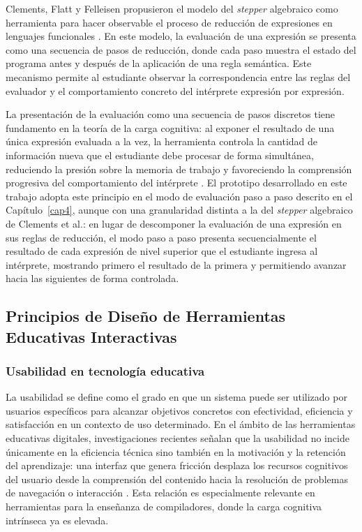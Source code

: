 Clements, Flatt y Felleisen propusieron el modelo del \textit{stepper} algebraico como herramienta para hacer observable el proceso de reducción de expresiones en lenguajes funcionales \cite{Clements2001}. En este modelo, la evaluación de una expresión se presenta como una secuencia de pasos de reducción, donde cada paso muestra el estado del programa antes y después de la aplicación de una regla semántica. Este mecanismo permite al estudiante observar la correspondencia entre las reglas del evaluador y el comportamiento concreto del intérprete expresión por expresión.

La presentación de la evaluación como una secuencia de pasos discretos tiene fundamento en la teoría de la carga cognitiva: al exponer el resultado de una única expresión evaluada a la vez, la herramienta controla la cantidad de información nueva que el estudiante debe procesar de forma simultánea, reduciendo la presión sobre la memoria de trabajo y favoreciendo la comprensión progresiva del comportamiento del intérprete \cite{sweller2024cognitive}. El prototipo desarrollado en este trabajo adopta este principio en el modo de evaluación paso a paso descrito en el Capítulo~\ref{cap4}, aunque con una granularidad distinta a la del \textit{stepper} algebraico de Clements et al.: en lugar de descomponer la evaluación de una expresión en sus reglas de reducción, el modo paso a paso presenta secuencialmente el resultado de cada expresión de nivel superior que el estudiante ingresa al intérprete, mostrando primero el resultado de la primera y permitiendo avanzar hacia las siguientes de forma controlada.

\subsection{Principios de Diseño de Herramientas Educativas Interactivas}

\subsubsection{Usabilidad en tecnología educativa}

La usabilidad se define como el grado en que un sistema puede ser utilizado por usuarios específicos para alcanzar objetivos concretos con efectividad, eficiencia y satisfacción en un contexto de uso determinado. En el ámbito de las herramientas educativas digitales, investigaciones recientes señalan que la usabilidad no incide únicamente en la eficiencia técnica sino también en la motivación y la retención del aprendizaje: una interfaz que genera fricción desplaza los recursos cognitivos del usuario desde la comprensión del contenido hacia la resolución de problemas de navegación o interacción \cite{lu2022usability}. Esta relación es especialmente relevante en herramientas para la enseñanza de compiladores, donde la carga cognitiva intrínseca ya es elevada.

